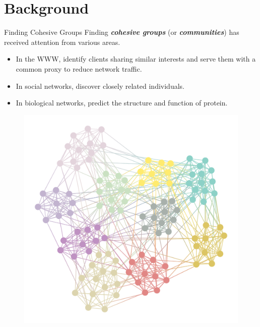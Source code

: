 \documentclass[9pt,notheorems]{beamer} %
\begin{document}
\section{Background}
\begin{frame}{Finding Cohesive Groups}
    \vspace{0.5cm}
    Finding \textbf{\emph{cohesive groups}} (or \textbf{\emph{communities}}) has received attention from various areas.
    \begin{itemize}
	    \item In the WWW, identify clients sharing similar interests and serve them with a common proxy to reduce network traffic.
	    \item In social networks, discover closely related individuals.
		\item In biological networks, predict the structure and function of protein.
	\end{itemize}
    \begin{figure}[h]
    \centering
    \includegraphics[width=0.4\linewidth]{pic/cohesive_groups.pdf}
    \end{figure}
\end{frame}
\end{document}
